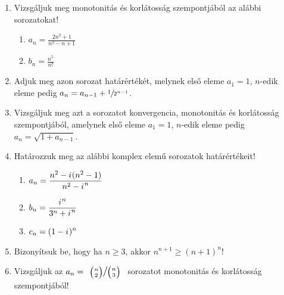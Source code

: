 \documentclass[a4paper, 12pt]{scrartcl}
\begin{document}
\begin{enumerate}
  \item Vizsgáljuk meg monotonitás és korlátosság szempontjából az alábbi
        sorozatokat!
        \begin{enumerate}
          \item $\displaystyle
                  a_n = \frac{2n^2 + 1}{n^2 - n + 1}
                $

          \item $\displaystyle
                  b_n = \frac{n^5}{n!}
                $
        \end{enumerate}

  \item Adjuk meg azon sorozat határértékét, melynek első eleme $a_1 = 1$,
        $n$-edik eleme pedig $a_n = a_{n - 1} + \sfrac{1}{2^{n - 1}}$.

  \item Vizsgáljuk meg azt a sorozatot konvergencia, monotonitás és korlátosság
        szempontjából, amelynek első eleme $a_1 = 1$, $n$-edik eleme pedig
        $a_n = \sqrt{1 + a_{n - 1}}$.

  \item Határozzuk meg az alábbi komplex elemű sorozatok határértékeit!
        \begin{enumerate}
          \item $\displaystyle
                  a_n = \frac{n^2 - {i\mkern1mu}(n^2 - 1)}{n^2 - {i\mkern1mu}^n}
                $

          \item $\displaystyle
                  b_n = \frac{{i\mkern1mu}^n}{3^n + {i\mkern1mu}^n}
                $

          \item $\displaystyle
                  c_n = (1 - {i\mkern1mu})^n
                $
        \end{enumerate}

  \item Bizonyítsuk be, hogy ha $n \geq 3$, akkor $n^{n + 1} \geq (n + 1)^n$!

  \item Vizsgáljuk az $a_n = \scalebox{1.25}{
        $\sfrac{\binom{n}{2}}{\binom{n}{3}}$
          }$ sorozatot monotonitás és korlátosság szempontjából!
\end{enumerate}

\end{document}
